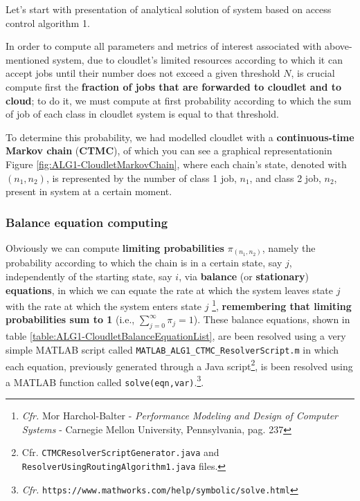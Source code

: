 \documentclass[10pt,a4paper]{article}
\begin{document}
Let's start with presentation of analytical solution of system based on access control algorithm 1.

In order to compute all parameters and metrics of interest associated with above-mentioned system, due to cloudlet's limited resources according to which it can accept jobs until their number does not exceed a given threshold $N$, is crucial compute first the \textbf{fraction of jobs that are forwarded to cloudlet and to cloud}; to do it, we must compute at first probability according to which the sum of job of each class in cloudlet system is equal to that threshold. 

To determine this probability, we had modelled cloudlet with a \textbf{continuous-time Markov chain} (\textbf{CTMC}), of which you can see a graphical representationin Figure \ref{fig:ALG1-CloudletMarkovChain}, where each chain's state, denoted with $(n_1,n_2)$, is represented by the number of class 1 job, $n_1$, and class 2 job, $n_2$, present in system at a certain moment.



\subsubsection{Balance equation computing} 

Obviously we can compute \textbf{limiting probabilities} $\pi_{(n_1,n_2)}$, namely the probability according to which the chain is in a certain state, say $j$, independently of the starting state, say $i$, via \textbf{balance} (or \textbf{stationary}) \textbf{equations}, in which we can equate the rate at which the system leaves state $j$ with the rate at which the system enters state $j$ \footnote{\textit{Cfr.} Mor Harchol-Balter - \textit{Performance Modeling and Design of Computer Systems} - Carnegie Mellon University, Pennsylvania, pag. 237}, \textbf{remembering that limiting probabilities sum to 1} (i.e., $\sum_{j=0}^\infty \pi_j = 1$).
These balance equations, shown in table \ref{table:ALG1-CloudletBalanceEquationList}, are been resolved using a very simple MATLAB script called \texttt{MATLAB\_ALG1\_CTMC\_ResolverScript.m} in which each equation, previously generated through a Java script\footnote{Cfr. \texttt{CTMCResolverScriptGenerator.java} and \texttt{ResolverUsingRoutingAlgorithm1.java} files.}, is been resolved using a MATLAB function called \texttt{solve(eqn,var)}.\footnote{\textit{Cfr.} \texttt{https://www.mathworks.com/help/symbolic/solve.html}}. 
\end{document}
